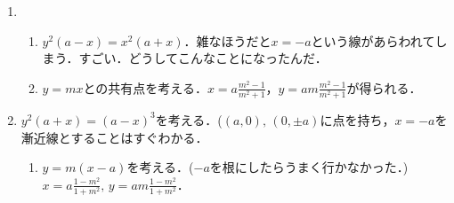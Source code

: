 \documentclass[9pt]{ltjsarticle}
\begin{document}
\begin{enumerate}[label=(問題\arabic*)]
\begin{enumerate}[label=(\alph*)]
\end{enumerate}
 \item
\begin{enumerate}[label=(\alph*)]
 \item $y^2(a-x)=x^2(a+x)$．雑なほうだと$x=-a$という線があらわれてしまう．すごい．どうしてこんなことになったんだ．
 \item $y=mx$との共有点を考える．$x=a\frac{m^2-1}{m^2+1}$，$y=am\frac{m^2-1}{m^2+1}$が得られる．
\end{enumerate}
 \item $y^2(a+x)=(a-x)^3$を考える．($(a,0),\,(0,\pm a)$に点を持ち，$x=-a$を漸近線とすることはすぐわかる．
\begin{enumerate}[label=(\alph*)]
 \item $y=m(x-a)$を考える．($-a$を根にしたらうまく行かなかった．)
$x=a\frac{1-m^2}{1+m^2},\, y=am\frac{1-m^2}{1+m^2}$．


\end{enumerate}
\end{enumerate}
\end{document}
